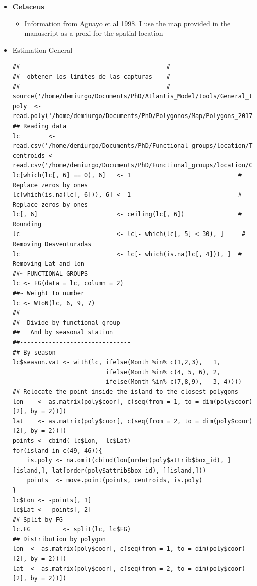 \documentclass[11pt]{article}
\begin{document}
\begin{itemize}
\begin{itemize}
\begin{itemize}
\item \textbf{Cetaceus}
\begin{itemize}
\item Information from Aguayo et al 1998. I use the map provided in the manuscript as a proxi for the spatial location
\end{itemize}
\item Estimation General

\begin{verbatim}
##-----------------------------------------#
##  obtener los limites de las capturas    #
##-----------------------------------------#
source('/home/demiurgo/Documents/PhD/Atlantis_Model/tools/General_tools/Atlantis_tools.R')
poly  <- read.poly('/home/demiurgo/Documents/PhD/Polygonos/Map/Polygons_20170510.csv')
## Reading data
lc        <- read.csv('/home/demiurgo/Documents/PhD/Functional_groups/location/Total/Distribution.csv')
centroids <- read.csv('/home/demiurgo/Documents/PhD/Functional_groups/location/Cover/centroids.csv')
lc[which(lc[, 6] == 0), 6]   <- 1                              # Replace zeros by ones
lc[which(is.na(lc[, 6])), 6] <- 1                              # Replace zeros by ones
lc[, 6]                      <- ceiling(lc[, 6])               # Rounding
lc                           <- lc[- which(lc[, 5] < 30), ]     # Removing Desventuradas
lc                           <- lc[- which(is.na(lc[, 4])), ]  # Removing Lat and lon
##~ FUNCTIONAL GROUPS
lc <- FG(data = lc, column = 2)
##~ Weight to number
lc <- WtoN(lc, 6, 9, 7)
##-------------------------------
##  Divide by functional group
##   And by seasonal station
##-------------------------------
## By season
lc$season.vat <- with(lc, ifelse(Month %in% c(1,2,3),   1,
                          ifelse(Month %in% c(4, 5, 6), 2,
                          ifelse(Month %in% c(7,8,9),   3, 4))))
## Relocate the point inside the island to the closest polygons
lon    <- as.matrix(poly$coor[, c(seq(from = 1, to = dim(poly$coor)[2], by = 2))])
lat    <- as.matrix(poly$coor[, c(seq(from = 2, to = dim(poly$coor)[2], by = 2))])
points <- cbind(-lc$Lon, -lc$Lat)
for(island in c(49, 46)){
    is.poly <- na.omit(cbind(lon[order(poly$attrib$box_id), ][island,], lat[order(poly$attrib$box_id), ][island,]))
    points  <- move.point(points, centroids, is.poly)
}
lc$Lon <- -points[, 1]
lc$Lat <- -points[, 2]
## Split by FG
lc.FG         <- split(lc, lc$FG)
## Distribution by polygon
lon  <- as.matrix(poly$coor[, c(seq(from = 1, to = dim(poly$coor)[2], by = 2))])
lat  <- as.matrix(poly$coor[, c(seq(from = 2, to = dim(poly$coor)[2], by = 2))])

\end{verbatim}
\end{itemize}
\end{itemize}
\end{itemize}
\end{document}
